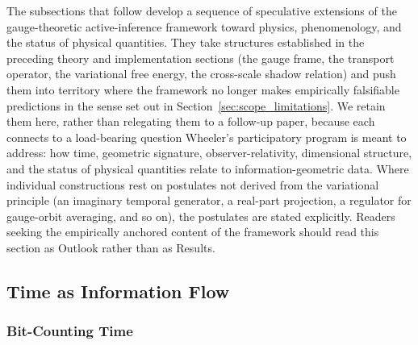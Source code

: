 \documentclass[11pt]{article}
\begin{document}
The subsections that follow develop a sequence of speculative extensions of the gauge-theoretic active-inference framework toward physics, phenomenology, and the status of physical quantities. They take structures established in the preceding theory and implementation sections (the gauge frame, the transport operator, the variational free energy, the cross-scale shadow relation) and push them into territory where the framework no longer makes empirically falsifiable predictions in the sense set out in Section~\ref{sec:scope_limitations}. We retain them here, rather than relegating them to a follow-up paper, because each connects to a load-bearing question Wheeler's participatory program is meant to address: how time, geometric signature, observer-relativity, dimensional structure, and the status of physical quantities relate to information-geometric data. Where individual constructions rest on postulates not derived from the variational principle (an imaginary temporal generator, a real-part projection, a regulator for gauge-orbit averaging, and so on), the postulates are stated explicitly. Readers seeking the empirically anchored content of the framework should read this section as Outlook rather than as Results.

\subsection{Time as Information Flow}

\subsubsection{Bit-Counting Time}
\end{document}
